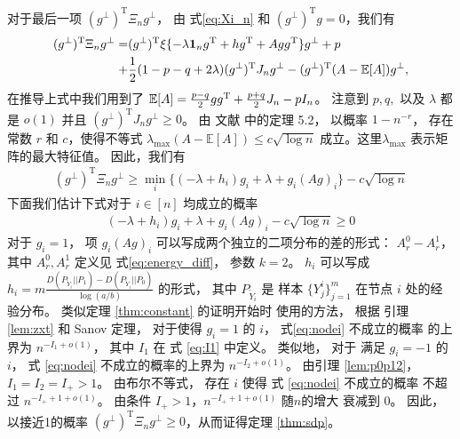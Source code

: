 对于最后一项 $(g^{\perp})^{\mathrm{T}} \Xi_n g^{\perp}$，
由 式\eqref{eq:Xi_n} 和 $(g^{\perp})^{\mathrm{T}}g=0$，我们有
\begin{align*}
    (g^{\perp})^{\mathrm{T}} \Xi_n g^{\perp} 
    =& (g^{\perp})^{\mathrm{T}} \xi\{ -\lambda \mathbf{1}_ng^{\mathrm{T}}+hg^{\mathrm{T}} + Agg^{\mathrm{T}} \} g^{\perp} + p \\
    +& \frac{1}{2}(1-p-q+2\lambda)(g^{\perp})^{\mathrm{T}}J_n g^{\perp}
    -(g^{\perp})^{\mathrm{T}}(A-\operatorname{\mathbb{E}}[A])g^{\perp},
\end{align*}
在推导上式中我们用到了 $\operatorname{\mathbb{E}}[A] = \frac{p-q}{2}gg^{\mathrm{T}} + \frac{p+q}{2}J_n - pI_n$。
注意到 $p,q,$ 以及 $\lambda$ 都是 $o(1)$ 并且
$(g^{\perp})^{\mathrm{T}}J_n g^{\perp}\ge 0$。
由 文献 中的定理 5.2，
以概率 $1-n^{-r}$， 存在
常数 $r$ 和 $c$，使得不等式 $\lambda_{\max}(A-\mathbb{E}[A]) \leq c\sqrt{\log n}$
成立。这里$\lambda_{\max}$ 表示矩阵的最大特征值。
因此，我们有
\begin{align}\label{eq:lastterm}
    (g^{\perp})^{\mathrm{T}} \Xi_n g^{\perp} \geq \min_i\{(-\lambda + h_i) g_i+\lambda + g_i (Ag)_i \} - c \sqrt{\log n}
\end{align}
下面我们估计下式对于 $i\in [n]$ 均成立的概率
\begin{align}\label{eq:nodei}
    (-\lambda + h_i) g_i+\lambda + g_i (Ag)_i  - c \sqrt{\log n}\ge 0
\end{align}
对于 $g_i=1$，
项 $g_i(Ag)_i$ 可以写成两个独立的二项分布的差的形式：
$A_r^0-A_r^1$，其中 $A_r^0, A_r^1$ 定义见 式\eqref{eq:energy_diff}， 参数 $k=2$。
$h_i$ 可以写成 $h_i=m \frac{D(P_{\widetilde{Y}_i} || P_1) - D(P_{\widetilde{Y}_i} || P_0) }{\log (a /b)}$
的形式，
其中 $P_{\widetilde{Y}_i}$ 是
样本 $\{Y^i_j\}^m_{j=1}$ 在节点 $i$ 处的经验分布。
类似定理 \ref{thm:constant} 的证明开始时
使用的方法，
根据 引理 \ref{lem:zxt}  和  Sanov 定理，
对于使得 $g_i=1$ 的 $i$， 
式\eqref{eq:nodei} 不成立的概率
的上界为
$n^{-I_1 + o(1)}$，
其中 $I_1$ 在 式 \eqref{eq:I1} 中定义。
类似地，
对于 满足 $g_i=-1$ 的  $i$，
式 \eqref{eq:nodei} 不成立的概率的上界为 
$n^{-I_2 + o(1)}$。
由引理 \ref{lem:p0p12}，$I_1=I_2=I_+>1$。
由布尔不等式， 存在 $i$ 使得 式 \eqref{eq:nodei} 不成立的概率 不超过 $n^{-I_+ + 1 + o(1)}$。
由条件 $I_+>1$，$n^{-I_+ + 1 + o(1)}$ 随$n$的增大 衰减到 $0$。
因此，以接近1的概率 $(g^{\perp})^{\mathrm{T}} \Xi_n g^{\perp}\ge 0$，从而证得定理 \ref{thm:sdp}。 


